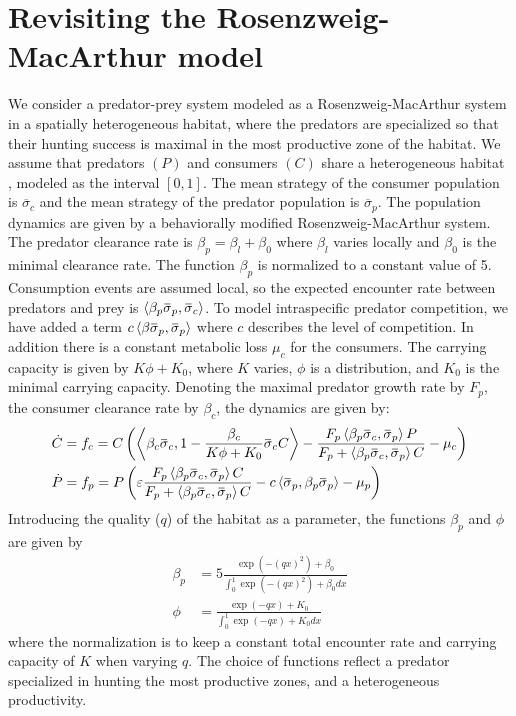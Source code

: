 \section*{Revisiting the Rosenzweig-MacArthur model}
We consider a predator-prey system modeled as a Rosenzweig-MacArthur system in a spatially heterogeneous habitat, where the predators are specialized so that their hunting success is maximal in the most productive zone of the habitat.
We assume that predators $(P)$ and consumers $(C)$ share a heterogeneous habitat , modeled as the interval $[0,1]$. The mean strategy of the consumer population is $\overbar{\sigma}_c$ and the mean strategy of the predator population is $\overbar{\sigma}_p$.
The population dynamics are given by a behaviorally modified Rosenzweig-MacArthur system. The predator clearance rate is $\beta_p = \beta_{l} + \beta_0$ where $\beta_l$ varies locally and $\beta_0$ is the minimal clearance rate. The function $\beta_p$ is normalized to a constant value of 5.
Consumption events are assumed local, so the expected encounter rate between predators and prey is $\ip{\beta_p \overbar{\sigma}_p}{\overbar{\sigma}_c}$. To model intraspecific predator competition, we have added a term $c\ip{\beta \overbar{\sigma}_p}{\overbar{\sigma}_p}$ where $c$ describes the level of competition. In addition there is a constant metabolic loss $\mu_c$ for the consumers. The carrying capacity is given by $K\phi + K_0$,
 where $K$ varies, $\phi$ is a distribution, and $K_0$ is the minimal carrying capacity. Denoting the maximal predator growth rate by $F_p$, the consumer clearance rate by $\beta_c$, the dynamics are given by:
\begin{align}
  \dot{C} &= f_c = C \pa{\ip{\beta_c \overbar{\sigma}_c}{1-\frac{\beta_c}{K\phi + K_0}\overbar{\sigma}_c C} - \frac{F_p \ip{\beta_p \overbar{\sigma}_c}{\overbar{\sigma}_p} P}{F_p + \ip{\beta_p \overbar{\sigma}_c}{\overbar{\sigma}_p} C} - \mu_c} \\
  \dot{P} &= f_p = P \pa{\epsilon \frac{F_p \ip{\beta_p \overbar{\sigma}_c}{\overbar{\sigma}_p} C}{F_p + \ip{\beta_p \overbar{\sigma}_c}{\overbar{\sigma}_p} C} - c \ip{\overbar{\sigma}_p}{\beta_p \overbar{\sigma}_p}  - \mu_p}
  \label{eq:dynamics}
\end{align}
Introducing the quality ($q$) of the habitat as a parameter, the functions $\beta_p$ and $\phi$ are given by
\begin{align}
  \beta_p &= 5 \frac{\exp(-(q x)^2) + \beta_0}{\int_0^1 \exp(-(q x)^2) + \beta_0 dx} \\
  \phi &= \frac{\exp(-q x) + K_0}{\int_0^1 \exp(-q x) + K_0 dx}
\end{align}
where the normalization is to keep a constant total encounter rate and carrying capacity of $K$ when varying $q$. The choice of functions reflect a predator specialized in hunting the most productive zones, and a heterogeneous productivity.

